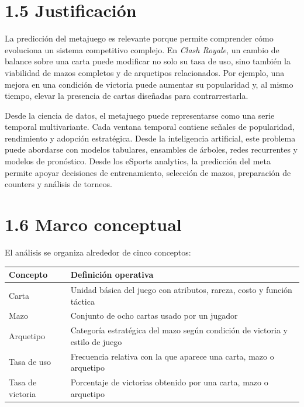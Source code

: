 \documentclass[
  spanish,
  12pt,
]{report}
\newcounter{none} %
\begin{document}
\section{1.5 Justificación}\label{justificaciuxf3n}

La predicción del metajuego es relevante porque permite comprender cómo
evoluciona un sistema competitivo complejo. En \emph{Clash Royale}, un
cambio de balance sobre una carta puede modificar no solo su tasa de
uso, sino también la viabilidad de mazos completos y de arquetipos
relacionados. Por ejemplo, una mejora en una condición de victoria puede
aumentar su popularidad y, al mismo tiempo, elevar la presencia de
cartas diseñadas para contrarrestarla.

Desde la ciencia de datos, el metajuego puede representarse como una
serie temporal multivariante. Cada ventana temporal contiene señales de
popularidad, rendimiento y adopción estratégica. Desde la inteligencia
artificial, este problema puede abordarse con modelos tabulares,
ensambles de árboles, redes recurrentes y modelos de pronóstico. Desde
los eSports analytics, la predicción del meta permite apoyar decisiones
de entrenamiento, selección de mazos, preparación de counters y análisis
de torneos.

\section{1.6 Marco conceptual}\label{marco-conceptual}

El análisis se organiza alrededor de cinco conceptos:

{\def\LTcaptype{none} %
\begin{longtable}[]{@{}
  >{\raggedright\arraybackslash}p{}
  >{\raggedright\arraybackslash}p{}@{}}
\toprule\noalign{}
\begin{minipage}[b]{\linewidth}\raggedright
Concepto
\end{minipage} & \begin{minipage}[b]{\linewidth}\raggedright
Definición operativa
\end{minipage} \\
\midrule\noalign{}
\endhead
\bottomrule\noalign{}
\endlastfoot
Carta & Unidad básica del juego con atributos, rareza, costo y función
táctica \\
Mazo & Conjunto de ocho cartas usado por un jugador \\
Arquetipo & Categoría estratégica del mazo según condición de victoria y
estilo de juego \\
Tasa de uso & Frecuencia relativa con la que aparece una carta, mazo o
arquetipo \\
Tasa de victoria & Porcentaje de victorias obtenido por una carta, mazo
o arquetipo \\
\end{longtable}
}
\end{document}
